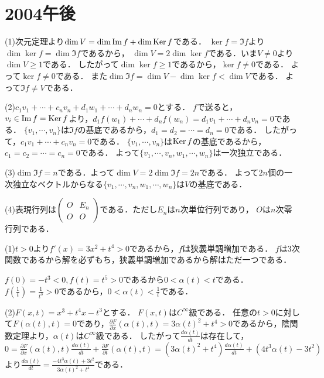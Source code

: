 \documentclass[
		book,
		head_space=20mm,
		foot_space=20mm,
		gutter=10mm,
		line_length=190mm
]{jlreq}
\begin{document}
\section{2004午後}
(1)次元定理より$\dim V=\dim \mathop{\mathrm{Im}} f+\dim \mathop{\mathrm{Ker}} f$である．
$\ker f=\Im f$より$\dim \ker f=\dim \Im f$であるから，
$\dim V=2\dim \ker f$である．いま$V\neq{0}$より$\dim V\ge 1$である．
したがって$\dim \ker f\ge 1$であるから，$\ker f\neq{0}$である．
よって$\ker f\neq{0}$である．
また$\dim \Im f=\dim V-\dim \ker f<\dim V$である．
よって$\Im f\neq V$である．

(2)$c_1v_1+\cdots+c_nv_n+d_1w_1+\cdots+d_n w_n=0$とする．
$f$で送ると，$v_i\in \mathop{\mathrm{Im}} f=\mathop{\mathrm{Ker}} f$より，$d_1f(w_1)+\cdots+d_nf(w_n)=d_1v_1+\cdots+d_nv_n=0$である．
$\{v_1,\cdots,v_n\}$は$\Im f$の基底であるから，$d_1=d_2=\cdots=d_n=0$である．
したがって，$c_1v_1+\cdots+c_nv_n=0$である．
$\{v_1,\cdots,v_n\}$は$\mathop{\mathrm{Ker}} f$の基底であるから，$c_1=c_2=\cdots=c_n=0$である．
よって$\{v_1,\cdots,v_n,w_1,\cdots,w_n\}$は一次独立である．

(3)$\dim \Im f=n$である．よって$\dim V=2\dim \Im f=2n$である．
よって$2n$個の一次独立なベクトルからなる$\{v_1,\cdots,v_n,w_1,\cdots,w_n\}$は$V$の基底である．

(4)表現行列は$\begin{pmatrix}
O& E_n\\
O& O
\end{pmatrix}$である．ただし$E_n$は$n$次単位行列であり，
$O$は$n$次零行列である．

(1)$t>0$より$f'(x)=3x^2+t^4>0$であるから，$f$は狭義単調増加である．
$f$は$3$次関数であるから解を必ずもち，狭義単調増加であるから解はただ一つである．

$f(0)=-t^3<0,f(t)=t^5>0$であるから$0<\alpha(t)<t$である．
$f(\frac{1}{t})=\frac{1}{t^3}>0$であるから，$0<\alpha(t)<\frac{1}{t}$である．

(2)$F(x,t)=x^3+t^4x-t^3$とする．
$F(x,t)$は$C^\infty$級である．
任意の$t>0$に対して$F(\alpha(t),t)=0$であり，$\frac{\partial F}{\partial x}(\alpha(t),t)=3\alpha(t)^2+t^4>0$であるから，陰関数定理より，$\alpha(t)$は$C^\infty$級である．
したがって$\frac{d\alpha(t)}{dt}$は存在して，
$0=\frac{\partial F}{\partial x}(\alpha(t),t)\frac{d\alpha(t)}{dt}+\frac{\partial F}{\partial t}(\alpha(t),t)=(3\alpha(t)^2+t^4)\frac{d\alpha(t)}{dt}+(4t^3\alpha(t)-3t^2)$
より$\frac{d\alpha(t)}{dt}=\frac{-4t^3\alpha(t)+3t^2}{3\alpha(t)^2+t^4}$である．
\end{document}
